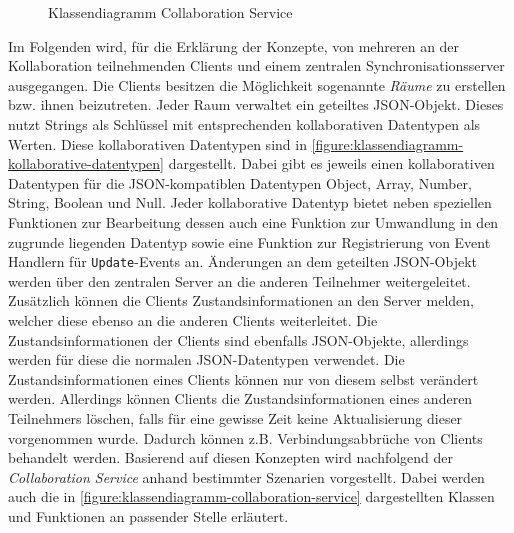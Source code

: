 \begin{figure}[tbp]
    \caption{Klassendiagramm Collaboration Service}
    \label{figure:klassendiagramm-collaboration-service}
\end{figure}

Im Folgenden wird, für die Erklärung der Konzepte, von mehreren an der Kollaboration teilnehmenden Clients und einem zentralen Synchronisationsserver ausgegangen. Die Clients besitzen die Möglichkeit sogenannte \textit{Räume} zu erstellen bzw. ihnen beizutreten. Jeder Raum verwaltet ein geteiltes JSON-Objekt. Dieses nutzt Strings als Schlüssel mit entsprechenden kollaborativen Datentypen als Werten. Diese kollaborativen Datentypen sind in \autoref{figure:klassendiagramm-kollaborative-datentypen} dargestellt. Dabei gibt es jeweils einen kollaborativen Datentypen für die JSON-kompatiblen Datentypen Object, Array, Number, String, Boolean und Null. Jeder kollaborative Datentyp bietet neben speziellen Funktionen zur Bearbeitung dessen auch eine Funktion zur Umwandlung in den zugrunde liegenden Datentyp sowie eine Funktion zur Registrierung von Event Handlern für \texttt{Update}-Events an. Änderungen an dem geteilten JSON-Objekt werden über den zentralen Server an die anderen Teilnehmer weitergeleitet. Zusätzlich können die Clients Zustandsinformationen an den Server melden, welcher diese ebenso an die anderen Clients weiterleitet. Die Zustandsinformationen der Clients sind ebenfalls JSON-Objekte, allerdings werden für diese die normalen JSON-Datentypen verwendet. Die Zustandsinformationen eines Clients können nur von diesem selbst verändert werden. Allerdings können Clients die Zustandsinformationen eines anderen Teilnehmers löschen, falls für eine gewisse Zeit keine Aktualisierung dieser vorgenommen wurde. Dadurch können z.B. Verbindungsabbrüche von Clients behandelt werden. Basierend auf diesen Konzepten wird nachfolgend der \textit{Collaboration Service} anhand bestimmter Szenarien vorgestellt. Dabei werden auch die in \autoref{figure:klassendiagramm-collaboration-service} dargestellten Klassen und Funktionen an passender Stelle erläutert.

